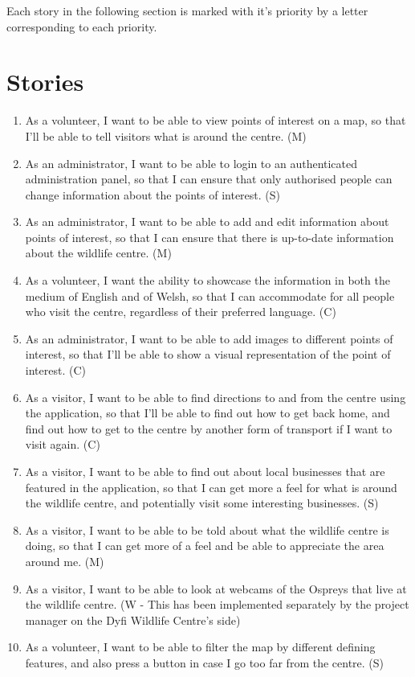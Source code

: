 Each story in the following section is marked with it's priority by a letter corresponding to each priority.

\section{Stories}
\label{user_stories}

\begin{enumerate}
	\item As a volunteer, I want to be able to view points of interest on a map, so that I'll be able to tell visitors what is around the centre. (M)
	\item As an administrator, I want to be able to login to an authenticated administration panel, so that I can ensure that only authorised people can change information about the points of interest. (S)
	\item As an administrator, I want to be able to add and edit information about points of interest, so that I can ensure that there is up-to-date information about the wildlife centre. (M)
	\item As a volunteer, I want the ability to showcase the information in both the medium of English and of Welsh, so that I can accommodate for all people who visit the centre, regardless of their preferred language. (C)
	\item As an administrator, I want to be able to add images to different points of interest, so that I'll be able to show a visual representation of the point of interest. (C)
	\item As a visitor, I want to be able to find directions to and from the centre using the application, so that I'll be able to find out how to get back home, and find out how to get to the centre by another form of transport if I want to visit again. (C)
	\item As a visitor, I want to be able to find out about local businesses that are featured in the application, so that I can get more a feel for what is around the wildlife centre, and potentially visit some interesting businesses. (S)
	\item As a visitor, I want to be able to be told about what the wildlife centre is doing, so that I can get more of a feel and be able to appreciate the area around me. (M)
	\item As a visitor, I want to be able to look at webcams of the Ospreys that live at the wildlife centre. (W - This has been implemented separately by the project manager on the Dyfi Wildlife Centre's side)
	\item As a volunteer, I want to be able to filter the map by different defining features, and also press a button in case I go too far from the centre. (S)
\end{enumerate}

